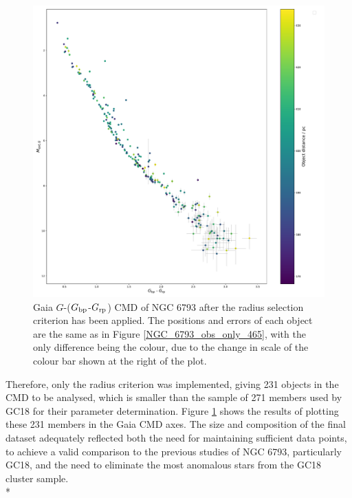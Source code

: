 \documentclass[12pt, a4paper]{report}
\begin{document}
\begin{figure}[h!]
\begin{center}
\includegraphics[width=1.0\textwidth]{../NGC_6793_CMD_observational_errorbars_vizier.pdf}
\caption{Gaia $G$-($G_{\textnormal{bp}}$-$G_{\textnormal{rp}}$) CMD of NGC 6793 after the radius selection criterion has been applied. The positions and errors of each object are the same as in Figure \ref{NGC_6793_obs_only_465}, with the only difference being the colour, due to the change in scale of the colour bar shown at the right of the plot.}
\label{NGC_6793_obs_only}
\end{center}
\end{figure}

Therefore, only the radius criterion was implemented, giving 231 objects in the CMD to be analysed, which is smaller than the sample of 271 members used by GC18 for their parameter determination. Figure \ref{NGC_6793_obs_only} shows the results of plotting these 231 members in the Gaia CMD axes. The size and composition of the final dataset adequately reflected both the need for maintaining sufficient data points, to achieve a valid comparison to the previous studies of NGC 6793, particularly GC18, and the need to eliminate the most anomalous stars from the GC18 cluster sample.\\*
\end{document}
